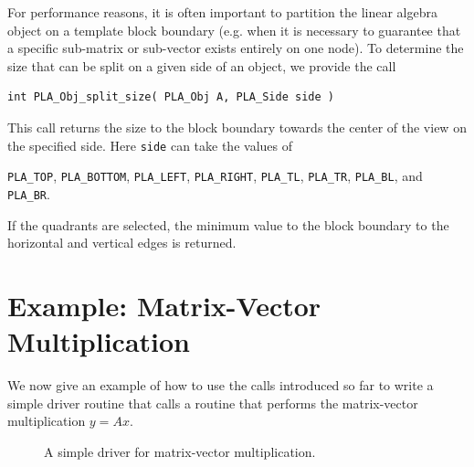 For performance reasons, it is often important to
partition the linear algebra object on a template block
boundary (e.g. when it is
necessary to guarantee that a specific sub-matrix or
sub-vector exists entirely on one node).
To determine the size that can be split on
a given side of an object, we provide the call
\begin{FlaSpec}
\begin{verbatim}
int PLA_Obj_split_size( PLA_Obj A, PLA_Side side )
\end{verbatim}
\end{FlaSpec}
This call returns the size to the block boundary 
towards the center of the view on the specified side.
Here {\tt side} can take the values of 
\begin{center}
{\tt PLA\_TOP}, {\tt PLA\_BOTTOM}, {\tt PLA\_LEFT}, {\tt PLA\_RIGHT},
{\tt PLA\_TL}, {\tt PLA\_TR}, {\tt PLA\_BL}, and {\tt PLA\_BR}.
\end{center}
If the quadrants are selected, the minimum value to the 
block boundary to the horizontal and vertical edges is returned.



\section{Example: Matrix-Vector Multiplication}

We now give an example of how to use the calls introduced so
far to write a simple driver routine that calls a routine
that performs the matrix-vector multiplication $ y = A x $.
\begin{figure}[htp]
\center
{}
\caption{A simple driver for matrix-vector multiplication.}
\label{code:mv_mult}
\end{figure}

